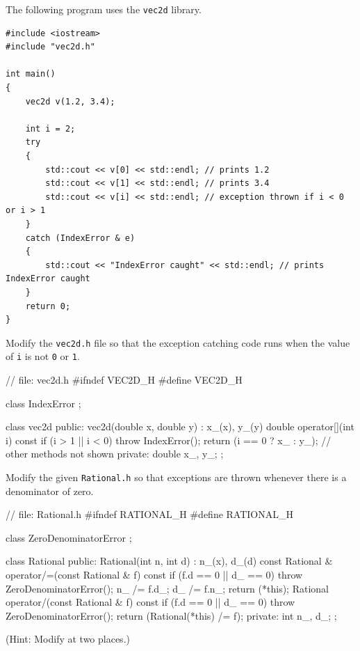 

\nextq
The following program uses the \verb!vec2d! library.
\begin{Verbatim}[frame=single, fontsize=\footnotesize]
#include <iostream>
#include "vec2d.h"

int main()
{
    vec2d v(1.2, 3.4);

    int i = 2;
    try
    {
        std::cout << v[0] << std::endl; // prints 1.2
        std::cout << v[1] << std::endl; // prints 3.4
        std::cout << v[i] << std::endl; // exception thrown if i < 0 or i > 1
    }
    catch (IndexError & e)
    {
        std::cout << "IndexError caught" << std::endl; // prints IndexError caught
    }
    return 0;
}
\end{Verbatim}
Modify the \verb!vec2d.h! file
so that the exception catching code runs when the value of \verb!i!
is not \verb!0! or \verb!1!.
\\
\ANSWER
\begin{answercode}
// file: vec2d.h
#ifndef VEC2D_H
#define VEC2D_H

class IndexError
{};

class vec2d
{
public:
    vec2d(double x, double y)
        : x_(x), y_(y)
    {}
    double operator[](int i) const
    {
        if (i > 1 || i < 0) throw IndexError();
        return (i == 0 ? x_ : y_);
    }
    // other methods not shown
private:
    double x_, y_;
};
\end{answercode}

\nextq
Modify the given \verb!Rational.h! so that exceptions are thrown whenever
there is a denominator of zero.
\\
\ANSWER
\begin{answercode}
// file: Rational.h
#ifndef RATIONAL_H
#define RATIONAL_H

class ZeroDenominatorError
{};

class Rational
{
public:
    Rational(int n, int d)
        : n_(x), d_(d)
    {}
    const Rational & operator/=(const Rational & f) const
    {
        if (f.d == 0 || d_ == 0) throw ZeroDenominatorError(); 
        n_ /= f.d_;
        d_ /= f.n_;
        return (*this);
    }
    Rational operator/(const Rational & f) const
    {
        if (f.d == 0 || d_ == 0) throw ZeroDenominatorError(); 
        return (Rational(*this) /= f);
    }
private:
    int n_, d_;
};
\end{answercode}
(Hint: Modify at two places.)


